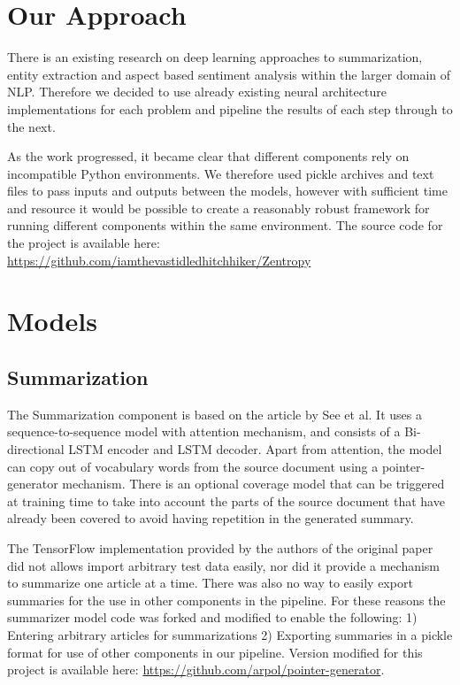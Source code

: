 \documentclass[12pt,a4paper]{article}
\begin{document}
\section{Our Approach}
There is an existing research on deep learning approaches to summarization, entity extraction and aspect based sentiment analysis within the larger domain of NLP. Therefore we decided to use already existing neural architecture implementations for each problem and pipeline the results of each step through to the next. 


As the work progressed, it became clear that different components rely on incompatible Python environments. We therefore used pickle archives and text files to pass inputs and outputs between the models, however with sufficient time and resource it would be possible to create a reasonably robust framework for running different components within the same environment. The source code for the project is available here: \\\mbox{\url{https://github.com/iamthevastidledhitchhiker/Zentropy}}

\section{Models}
\subsection{Summarization}
The Summarization component is based on the article by See et al\cite{See2017}. It uses a sequence-to-sequence model with attention mechanism, and consists of a Bi-directional LSTM encoder and LSTM decoder. Apart from attention, the model can copy out of vocabulary words from the source document using a pointer-generator mechanism. There is an optional coverage model that can be triggered at training time to take into account the parts of the source document that have already been covered to avoid having repetition in the generated summary. 

The TensorFlow implementation provided by the authors of the original paper did not allows import arbitrary test data easily, nor did it provide a mechanism to summarize one article at a time. There was also no way to easily export summaries for the use in other components in the pipeline. For these reasons the summarizer model code was forked and modified to enable the following: 1) Entering arbitrary articles for summarizations 2) Exporting summaries in a pickle format for use of other components in our pipeline. Version modified for this project is available here: \url{https://github.com/arpol/pointer-generator}. 
\end{document}
